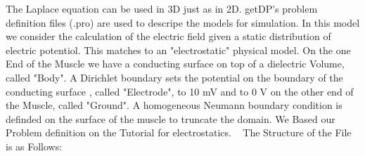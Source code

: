 \documentclass[preprint,journal]{vgtc}       %
\begin{document}
The Laplace equation can be used in 3D just as in 2D. getDP's problem definition files (.pro) are used to descripe the models for simulation. In this model we consider the calculation of the electric field given a static distribution of electric potentiol. This matches to an "electrostatic" physical model. On the one End of the Muscle we have a conducting surface on top of a dielectric Volume, called "Body". A Dirichlet boundary sets the potential on the boundary of the conducting surface , called "Electrode", to 10 mV and to 0 V on the other end of the Muscle, called "Ground".
A homogeneous Neumann boundary condition is definded on the surface of the muscle to truncate the domain.\newline
We Based our Problem definition on the Tutorial for electrostatics. ~\cite{Geuzaine2009}
The Structure of the File is as Follows:
\end{document}
